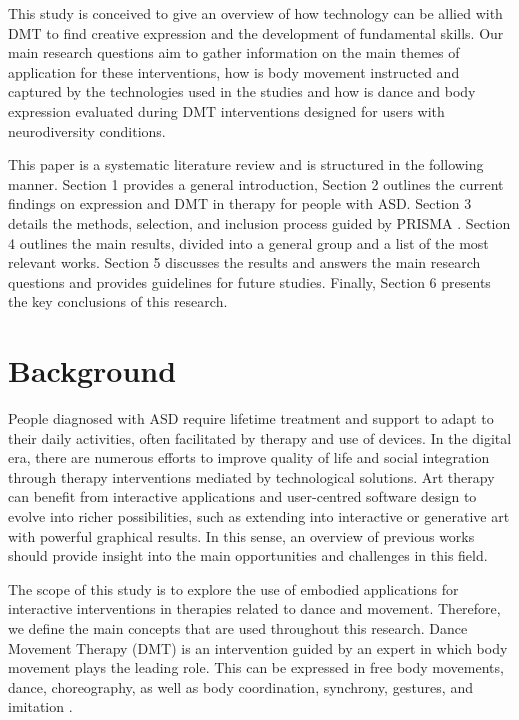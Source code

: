 \documentclass[a4paper,fleqn]{cas-sc}
\begin{document}
This study is conceived to give an overview of how technology can be allied with DMT to find creative expression and the development of fundamental skills. 
Our main research questions aim to gather information on the main themes of application for these interventions, how is  body movement instructed and captured by the technologies used in the studies and how is dance and body expression evaluated during DMT interventions designed for users with neurodiversity conditions.

This paper is a systematic literature review and is structured in the following manner. Section 1 provides a general introduction, Section 2 outlines the current findings on expression and DMT in therapy for people with ASD. Section 3 details the methods, selection, and inclusion process guided by PRISMA \cite{Pagen71}. Section 4 outlines the main results, divided into a general group and a list of the most relevant works. Section 5 discusses the results and answers the main research questions and provides guidelines for future studies. Finally, Section 6 presents the key conclusions of this research.



\section{Background} 
\label{sec2:bg}
People diagnosed with ASD require lifetime treatment and support to adapt to their daily activities, often facilitated by therapy and use of devices\cite{Lord20}.
 In the digital era, there are numerous efforts to improve quality of life and social integration through therapy interventions mediated by technological solutions. Art therapy can benefit from interactive applications and user-centred software design to evolve into richer possibilities, such as extending into interactive or generative art with powerful graphical results. In this sense, an overview of previous works should provide insight into the main opportunities and challenges in this field.


The scope of this study is to explore the use of embodied applications for interactive interventions in therapies related to dance and movement. Therefore, we define the main concepts that are used throughout this research.
Dance Movement Therapy (DMT) is an intervention guided by an expert in which body movement plays the leading role. This can be expressed in free body movements, dance, choreography, as well as body coordination, synchrony, gestures, and imitation \cite{Sheets10}.
\end{document}
